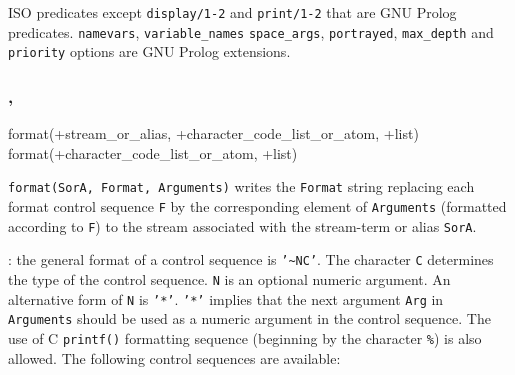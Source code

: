 \Portability

ISO predicates except \texttt{display/1-2} and \texttt{print/1-2} that
are GNU Prolog predicates. \texttt{namevars}, \texttt{variable\_names} \texttt{space\_args},
\texttt{portrayed}, \texttt{max\_depth} and \texttt{priority}
options are GNU Prolog extensions.

\subsubsection{,\label{format/3}
               }


\begin{TemplatesOneCol}
format(+stream\_or\_alias, +character\_code\_list\_or\_atom,
+list)\\
format(+character\_code\_list\_or\_atom, +list)

\end{TemplatesOneCol}

\Description

\texttt{format(SorA, Format, Arguments)} writes the \texttt{Format} string
replacing each format control sequence \texttt{F} by the corresponding
element of \texttt{Arguments} (formatted according to \texttt{F}) to the
stream associated with the stream-term or alias \texttt{SorA}.

: the general format of a control sequence
is \texttt{'\~{}NC'}. The character \texttt{C} determines the type of
the control sequence. \texttt{N} is an optional numeric argument. An
alternative form of \texttt{N} is \texttt{'*'}. \texttt{'*'} implies
that the next argument \texttt{Arg} in \texttt{Arguments} should be
used as a numeric argument in the control sequence. The use of C
\texttt{printf()} formatting sequence (beginning by the character
\texttt{\%}) is also allowed. The following control sequences are
available:

